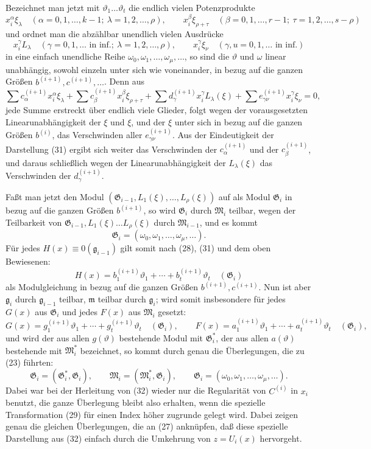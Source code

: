 \documentclass[11pt]{article}
\providecommand{\Gmod}{\mathfrak G}
\providecommand{\Mmod}{\mathfrak M}
\providecommand{\mideal}{\mathfrak m}
\providecommand{\gideal}{\mathfrak g}
\begin{document}
Bezeichnet man jetzt mit $\vartheta_1\ldots\vartheta_t$ die endlich vielen Potenzprodukte
\[
 x_i^\alpha\xi_\lambda\quad(\alpha=0,1,\ldots,k-1;\ \lambda=1,2,\ldots,\rho),\qquad
 x_i^\beta\xi_{\rho+\tau}\quad(\beta=0,1,\ldots,r-1;\ \tau=1,2,\ldots,s-\rho)
\]
und ordnet man die abzählbar unendlich vielen Ausdrücke
\[
 x_i^\gamma L_\lambda\quad(\gamma=0,1,\ldots\text{ in inf.};\ \lambda=1,2,\ldots,\rho),
 \qquad
 x_i^\gamma\xi_\nu\quad(\gamma,
u=0,1,\ldots\text{ in inf.})
\]
in eine einfach unendliche Reihe $\omega_0,\omega_1,\ldots,\omega_\mu,\ldots$, so sind die $\vartheta$ und $\omega$ linear unabhängig, sowohl einzeln unter sich wie voneinander, in bezug auf die ganzen Größen $b^{(i+1)},c^{(i+1)},\ldots$. Denn aus
\[
 \sum c^{(i+1)}_\alpha x_i^\alpha\xi_\lambda+
 \sum c^{(i+1)}_\beta x_i^\beta\xi_{\rho+\tau}+
 \sum d^{(i+1)}_\gamma x_i^\gamma L_\lambda(\xi)+
 \sum e^{(i+1)}_{\gamma\nu}x_i^\gamma\xi_\nu=0,
\]
jede Summe erstreckt über endlich viele Glieder, folgt wegen der vorausgesetzten Linearunabhängigkeit der $\xi$ und $\xi$, und der $\xi$ unter sich in bezug auf die ganzen Größen $b^{(i)}$, das Verschwinden aller $e^{(i+1)}_{\gamma\nu}$. Aus der Eindeutigkeit der Darstellung (31) ergibt sich weiter das Verschwinden der $c^{(i+1)}_\alpha$ und der $c^{(i+1)}_\beta$, und daraus schließlich wegen der Linearunabhängigkeit der $L_\lambda(\xi)$ das Verschwinden der $d^{(i+1)}_\gamma$.

Faßt man jetzt den Modul $(\Gmod_{i-1},L_1(\xi),\ldots,L_\rho(\xi))$ auf als Modul $\Gmod_i$ in bezug auf die ganzen Größen $b^{(i+1)}$, so wird $\Gmod_i$ durch $\Mmod_i$ teilbar, wegen der Teilbarkeit von $\Gmod_{i-1},L_1(\xi)\ldots L_\rho(\xi)$ durch $\Mmod_{i-1}$, und es kommt
\[
 \Gmod_i=(\omega_0,\omega_1,\ldots,\omega_\mu,\ldots).
\]
Für jedes $H(x)\equiv0(\gideal_{i-1})$ gilt somit nach (28), (31) und dem oben Bewiesenen:
\[
 H(x)=b^{(i+1)}_1\vartheta_1+\cdots+b^{(i+1)}_t\vartheta_t\quad(\Gmod_i)
\]
als Modulgleichung in bezug auf die ganzen Größen $b^{(i+1)},c^{(i+1)}$. Nun ist aber $\gideal_i$ durch $\gideal_{i-1}$ teilbar, $\mideal$ teilbar durch $\gideal_i$; wird somit insbesondere für jedes $G(x)$ aus $\Gmod_i$ und jedes $F(x)$ aus $\Mmod_i$ gesetzt:
\[
 G(x)=g^{(i+1)}_1\vartheta_1+\cdots+g^{(i+1)}_t\vartheta_t\quad(\Gmod_i),\qquad
 F(x)=a^{(i+1)}_1\vartheta_1+\cdots+a^{(i+1)}_t\vartheta_t\quad(\Gmod_i),
\]
und wird der aus allen $g(\vartheta)$ bestehende Modul mit $\Gmod_i^*$, der aus allen $a(\vartheta)$ bestehende mit $\Mmod_i^*$ bezeichnet, so kommt durch genau die Überlegungen, die zu (23) führten:
\begin{equation}
 \Gmod_i=(\Gmod_i^*,\Gmod_i),\qquad
 \Mmod_i=(\Mmod_i^*,\Gmod_i),\qquad
 \Gmod_i=(\omega_0,\omega_1,\ldots,\omega_\mu,\ldots).
\tag{32}
\end{equation}
Dabei war bei der Herleitung von (32) wieder nur die Regularität von $C^{(i)}$ in $x_i$ benutzt, die ganze Überlegung bleibt also erhalten, wenn die spezielle Transformation (29) für einen Index höher zugrunde gelegt wird. Dabei zeigen genau die gleichen Überlegungen, die an (27) anknüpfen, daß diese spezielle Darstellung aus (32) einfach durch die Umkehrung von $z=U_i(x)$ hervorgeht.
\end{document}
